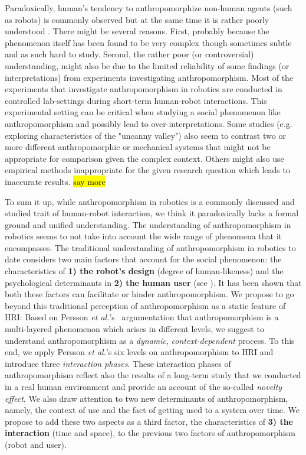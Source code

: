 \documentclass{frontiersSCNS} %
\begin{document}
Paradoxically, human's tendency to anthropomorphize non-human agents (such as
robots) is commonly observed but at the same time it is rather poorly understood
\cite{epley_seeing_2007}. There might be several reasons. First, probably
because the phenomenon itself has been found to be very complex though sometimes
subtle and as such hard to study. Second, the rather poor (or controversial)
understanding, might also be due to the limited reliability of some findings (or
interpretations) from experiments investigating anthropomorphism. Most of the
experiments that investigate anthropomorphism in robotics are conducted in
controlled lab-settings during short-term human-robot interactions. This
experimental setting can be critical when studying a social phenomenon like
anthropomorphism and possibly lead to over-interpretations. Some studies (e.g.
exploring characteristics of the "uncanny valley") also seem to contrast two or
more different anthropomorphic or mechanical systems that might not be
appropriate for comparison given the complex context. Others might also use
empirical methods inappropriate for the given research question which leads to
inaccurate results. \hl{say more}

To sum it up, while anthropomorphism in robotics is a commonly discussed and
studied trait of human-robot interaction, we think it paradoxically lacks a
formal ground and unified understanding. The understanding of anthropomorphism
in robotics seems to not take into account the wide range of phenomena that it
encompasses. The traditional understanding of anthropomorphism in robotics to
date considers two main factors that account for the social phenomenon: the
characteristics of \textbf{1) the robot's design} (degree of human-likeness) and
the psychological determinants in \textbf{2) the human user} (see
\cite{epley_seeing_2007}). It has been shown that both these factors can
facilitate or hinder anthropomorphism. We propose to go beyond this traditional
perception of anthropomorphism as a static feature of HRI: Based on Persson
\textit{et al.}'s~\cite{persson_anthropomorphism_2000} argumentation that
anthropomorphism is a multi-layered phenomenon which arises in different levels,
we suggest to understand anthropomorphism as a \emph{dynamic},
\emph{context-dependent} process. To this end, we apply Persson \textit{et
al.}'s six levels on anthropomorphism to HRI and introduce three
\emph{interaction phases}. These interaction phases of anthropomorphism reflect
also the results of a long-term study that we conducted in a real human
environment and provide an account of the so-called \textit{novelty effect}. We
also draw attention to two new determinants of anthropomorphism, namely, the
context of use and the fact of getting used to a system over time. We propose to
add these two aspects as a third factor, the characteristics of \textbf{3) the
interaction} (time and space), to the previous two factors of anthropomorphism
(robot and user). 
\end{document}
